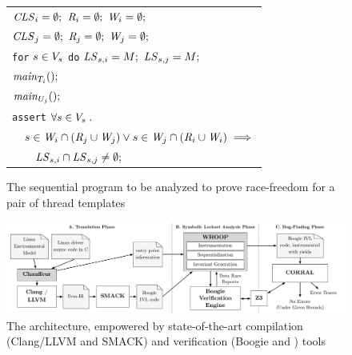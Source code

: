 \begin{figure}
\footnotesize
\begin{tabular}{l}
$\mathit{CLS}_{i} = \emptyset;$ $\mathit{R}_{i} = \emptyset;$ $\mathit{W}_{i} = \emptyset;$ \\
$\mathit{CLS}_{j} = \emptyset;$ $\mathit{R}_{j} = \emptyset;$ $\mathit{W}_{j} = \emptyset;$ \\
\texttt{for} $s \in V_s$ \texttt{do} $\mathit{LS}_{s,i} = M;$ $\mathit{LS}_{s,j} = M;$ \smallskip
\\

$\mathit{main}_{T_{i}}();$ \\
$\mathit{main}_{U_{j}}();$ \smallskip\\

\texttt{assert} $\forall s \in V_s \; .$ \\

$\quad s \in \mathit{W}_{i} \cap (\mathit{R}_{j} \cup \mathit{W}_{j}) \vee s \in \mathit{W}_{j} \cap (\mathit{R}_{i} \cup \mathit{W}_{i}) \implies$ \\

$\quad\quad \mathit{LS}_{s,i} \cap \mathit{LS}_{s,j} \neq \emptyset;$ \\

\end{tabular}
\caption{The sequential program to be analyzed to prove race-freedom for a pair of thread templates}
\label{fig:sequentialization}
\end{figure}

\begin{figure}
\centering
\includegraphics[width=.99\linewidth]{img/whoop.pdf}
\caption{The \whoop architecture, empowered by state-of-the-art compilation (Clang/LLVM and SMACK) and verification (Boogie and \corral) tools}
\label{fig:whoop}
\end{figure}

